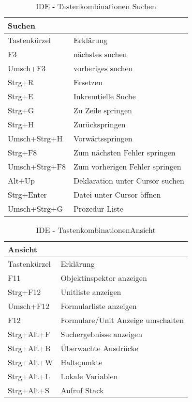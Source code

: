\begin{table}[htbp]
		\begin{tabular}[ht]{|l|l|}
      \hline
      Suchen & \\
      \hline
      Tastenkürzel & Erklärung \\
      \hline
      F3 & nächstes suchen\\
      Umsch+F3 & vorheriges suchen\\
      Strg+R & Ersetzen\\
      Strg+E & Inkremtielle Suche\\
      Strg+G & Zu Zeile springen\\
      Strg+H & Zurückspringen\\
      Umsch+Strg+H & Vorwärtsspringen\\
      Strg+F8 & Zum nächsten Fehler springen\\
      Umsch+Strg+F8 & Zum vorherigen Fehler springen\\
      Alt+Up & Deklaration unter Cursor suchen\\
      Strg+Enter & Datei unter Cursor öffnen\\
      Umsch+Strg+G & Prozedur Liste\\
      \hline
		\end{tabular}
  \caption{IDE - Tastenkombinationen Suchen}
  \label{tab:IDETastenkombSuchen} 
\end{table}
\begin{table}[htbp]
		\begin{tabular}[ht]{|l|l|}
      \hline
      Ansicht & \\
      \hline
      Tastenkürzel & Erklärung \\
      \hline
      F11 & Objektinspektor anzeigen\\
      Strg+F12 & Unitliste anzeigen\\
      Umsch+F12 & Formularliste anzeigen\\
      F12 & Formulare/Unit Anzeige umschalten\\
      Strg+Alt+F & Suchergebnisse anzeigen\\
      Strg+Alt+B & Überwachte Ausdrücke\\
      Strg+Alt+W & Haltepunkte\\
      Strg+Alt+L & Lokale Variablen\\
      Strg+Alt+S & Aufruf Stack\\
      \hline
		\end{tabular}
  \caption{IDE - TastenkombinationenAnsicht}
  \label{tab:IDETastenkombAnsicht} 
\end{table}
